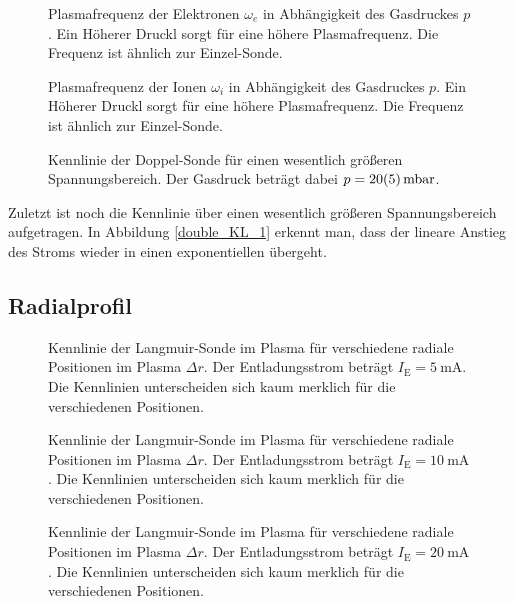 \begin{figure}[htbp]
    \centering
    
    \caption{
        Plasmafrequenz der Elektronen $\omega_e$ in Abh\"angigkeit des Gasdruckes $p$.
        Ein H\"oherer Druckl sorgt f\"ur eine h\"ohere Plasmafrequenz.
        Die Frequenz ist \"ahnlich zur Einzel-Sonde.
    }
    \label{double_wpe}
\end{figure}

\begin{figure}[htbp]
    \centering
    
    \caption{
        Plasmafrequenz der Ionen $\omega_i$ in Abh\"angigkeit des Gasdruckes $p$.
        Ein H\"oherer Druckl sorgt f\"ur eine h\"ohere Plasmafrequenz.
        Die Frequenz ist \"ahnlich zur Einzel-Sonde.
    }
    \label{double_wpi}
\end{figure}

\begin{figure}[htbp]
    \centering
    
    \caption{
        Kennlinie der Doppel-Sonde f\"ur einen wesentlich gr\"o\ss eren Spannungsbereich.
        Der Gasdruck betr\"agt dabei $p=\SI{20\pm 5}{\milli\bar}$.
    }
    \label{double_KL_1}
\end{figure}

Zuletzt ist noch die Kennlinie \"uber einen wesentlich gr\"o\ss eren Spannungsbereich aufgetragen.
In Abbildung \vref{double_KL_1} erkennt man, dass der lineare Anstieg des Stroms wieder in einen exponentiellen \"ubergeht.

\FloatBarrier
\subsection{Radialprofil}\label{radial}
\begin{figure}[htbp]
    \centering
    
    \caption{
        Kennlinie der Langmuir-Sonde im Plasma f\"ur verschiedene radiale Positionen im Plasma $\Delta r$.
        Der Entladungsstrom betr\"agt $I_\text{E}=\SI{5}{\milli\ampere}$.
        Die Kennlinien unterscheiden sich kaum merklich f\"ur die verschiedenen Positionen.
    }
    \label{radial_KL_I5}
\end{figure}
\begin{figure}[htbp]
    \centering
    
    \caption{
        Kennlinie der Langmuir-Sonde im Plasma f\"ur verschiedene radiale Positionen im Plasma $\Delta r$.
        Der Entladungsstrom betr\"agt $I_\text{E}=\SI{10}{\milli\ampere}$.
        Die Kennlinien unterscheiden sich kaum merklich f\"ur die verschiedenen Positionen.
    }
    \label{radial_KL_I10}
\end{figure}
\begin{figure}[htbp]
    \centering
    
    \caption{
        Kennlinie der Langmuir-Sonde im Plasma f\"ur verschiedene radiale Positionen im Plasma $\Delta r$.
        Der Entladungsstrom betr\"agt $I_\text{E}=\SI{20}{\milli\ampere}$.
        Die Kennlinien unterscheiden sich kaum merklich f\"ur die verschiedenen Positionen.
    }
    \label{radial_KL_I20}
\end{figure}

